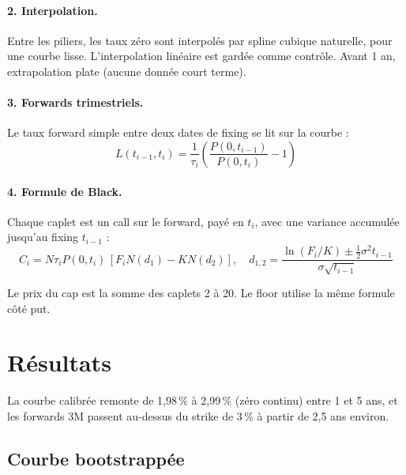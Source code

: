 \documentclass[11pt,a4paper]{article}
\begin{document}
\paragraph{2. Interpolation.} Entre les piliers, les taux zéro sont interpolés par spline cubique naturelle, pour une courbe lisse. L'interpolation linéaire est gardée comme contrôle. Avant 1 an, extrapolation plate (aucune donnée court terme).

\paragraph{3. Forwards trimestriels.} Le taux forward simple entre deux dates de fixing se lit sur la courbe :
\begin{equation}
L(t_{i-1},t_i) = \frac{1}{\tau_i}\left(\frac{P(0,t_{i-1})}{P(0,t_i)} - 1\right)
\end{equation}

\paragraph{4. Formule de Black.} Chaque caplet est un call sur le forward, payé en $t_i$, avec une variance accumulée jusqu'au fixing $t_{i-1}$ :
\begin{equation}
C_i = N \tau_i P(0,t_i)\,[F_i N(d_1) - K N(d_2)], \quad d_{1,2} = \frac{\ln(F_i/K) \pm \tfrac12 \sigma^2 t_{i-1}}{\sigma\sqrt{t_{i-1}}}
\end{equation}

Le prix du cap est la somme des caplets 2 à 20. Le floor utilise la même formule côté put.

\section{Résultats}
La courbe calibrée remonte de 1,98\,\% à 2,99\,\% (zéro continu) entre 1 et 5 ans, et les forwards 3M passent au-dessus du strike de 3\,\% à partir de 2,5 ans environ.

\subsection{Courbe bootstrappée}
\end{document}
